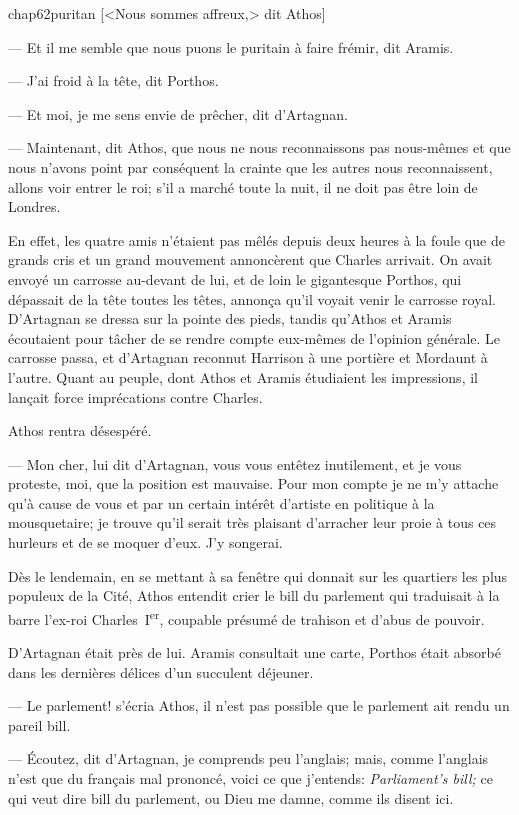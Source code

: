 \begin{bwbigpic}
	[\basicscale] 
	{chap62puritan}
	[<Nous sommes affreux,> dit Athos]
\end{bwbigpic}

— Et il me semble que nous puons le puritain à faire frémir, dit Aramis.

— J'ai froid à la tête, dit Porthos.

— Et moi, je me sens envie de prêcher, dit d'Artagnan.

— Maintenant, dit Athos, que nous ne nous reconnaissons pas nous-mêmes et que nous n'avons point par conséquent la crainte que les autres nous reconnaissent, allons voir entrer le roi; s'il a marché toute la nuit, il ne doit pas être loin de Londres.

En effet, les quatre amis n'étaient pas mêlés depuis deux heures à la foule que de grands cris et un grand mouvement annoncèrent que Charles arrivait. On avait envoyé un carrosse au-devant de lui, et de loin le gigantesque Porthos, qui dépassait de la tête toutes les têtes, annonça qu'il voyait venir le carrosse royal. D'Artagnan se dressa sur la pointe des pieds, tandis qu'Athos et Aramis écoutaient pour tâcher de se rendre compte eux-mêmes de l'opinion générale. Le carrosse passa, et d'Artagnan reconnut Harrison à une portière et Mordaunt à l'autre. Quant au peuple, dont Athos et Aramis étudiaient les impressions, il lançait force imprécations contre Charles.

Athos rentra désespéré.

— Mon cher, lui dit d'Artagnan, vous vous entêtez inutilement, et je vous proteste, moi, que la position est mauvaise. Pour mon compte je ne m'y attache qu'à cause de vous et par un certain intérêt d'artiste en politique à la mousquetaire; je trouve qu'il serait très plaisant d'arracher leur proie à tous ces hurleurs et de se moquer d'eux. J'y songerai.

Dès le lendemain, en se mettant à sa fenêtre qui donnait sur les quartiers les plus populeux de la Cité, Athos entendit crier le bill du parlement qui traduisait à la barre l'ex-roi Charles~I\textsuperscript{er}, coupable présumé de trahison et d'abus de pouvoir.

D'Artagnan était près de lui. Aramis consultait une carte, Porthos était absorbé dans les dernières délices d'un succulent déjeuner.

— Le parlement! s'écria Athos, il n'est pas possible que le parlement ait rendu un pareil bill.

— Écoutez, dit d'Artagnan, je comprends peu l'anglais; mais, comme l'anglais n'est que du français mal prononcé, voici ce que j'entends: \textit{Parliament's bill;} ce qui veut dire bill du parlement, ou Dieu me damne, comme ils disent ici.

